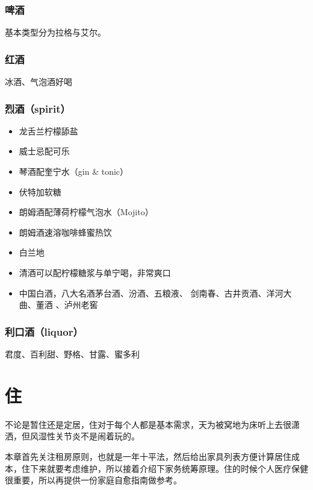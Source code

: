 \documentclass[
  letterpaper,
  DIV=11,
  numbers=noendperiod]{scrreprt}
\begin{document}
\subsection{啤酒}\label{ux5564ux9152}

基本类型分为拉格与艾尔。

\subsection{红酒}\label{ux7ea2ux9152}

冰酒、气泡酒好喝

\subsection{烈酒（spirit）}\label{ux70c8ux9152spirit}

\begin{itemize}
\item
  龙舌兰柠檬舔盐
\item
  威士忌配可乐
\item
  琴酒配奎宁水（gin \& tonic）
\item
  伏特加软糖
\item
  朗姆酒配薄荷柠檬气泡水（Mojito）
\item
  朗姆酒速溶咖啡蜂蜜热饮
\item
  白兰地
\item
  清酒可以配柠檬糖浆与单宁喝，非常爽口
\item
  中国白酒，八大名酒茅台酒、汾酒、五粮液、
  剑南春、古井贡酒、洋河大曲、董酒 、泸州老窖
\end{itemize}

\subsection{利口酒（liquor）}\label{ux5229ux53e3ux9152liquor}

君度、百利甜、野格、甘露、蜜多利


\chapter{住}\label{ux4f4f}

不论是暂住还是定居，住对于每个人都是基本需求，天为被窝地为床听上去很潇洒，但风湿性关节炎不是闹着玩的。

本章首先关注租房原则，也就是一年十平法，然后给出家具列表方便计算居住成本，住下来就要考虑维护，所以接着介绍下家务统筹原理。住的时候个人医疗保健很重要，所以再提供一份家庭自愈指南做参考。
\end{document}
